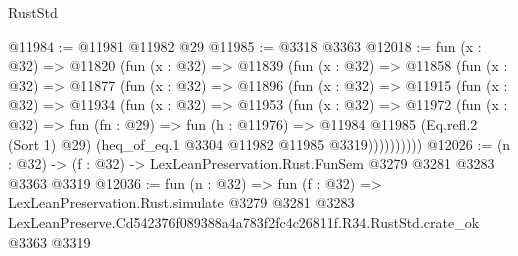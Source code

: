 \begin{lexlean}{RustStd}
\begin{coremodule}
@11984 := @11981 @11982 @29
@11985 := @3318 @3363
@12018 := fun (x : @32) =>
  @11820
    (fun (x : @32) =>
    @11839
      (fun (x : @32) =>
      @11858
        (fun (x : @32) =>
        @11877
          (fun (x : @32) =>
          @11896
            (fun (x : @32) =>
            @11915
              (fun (x : @32) =>
              @11934
                (fun (x : @32) =>
                @11953
                  (fun (x : @32) =>
                  @11972
                    (fun (x : @32) =>
                    fun (fn : @29) =>
                    fun (h : @11976) =>
                    @11984
                      @11985
                      (Eq.refl.{2} (Sort 1) @29)
                      (heq_of_eq.{1} @3304 @11982 @11985 @3319))))))))))
@12026 := (n : @32) -> (f : @32) -> LexLeanPreservation.Rust.FunSem @3279 @3281 @3283 @3363 @3319
@12036 := fun (n : @32) =>
  fun (f : @32) =>
  LexLeanPreservation.Rust.simulate
    @3279
    @3281
    @3283
    LexLeanPreserve.Cd542376f089388a4a783f2fc4c26811f.R34.RustStd.crate_ok
    @3363
    @3319
\end{coremodule}
\end{lexlean}
